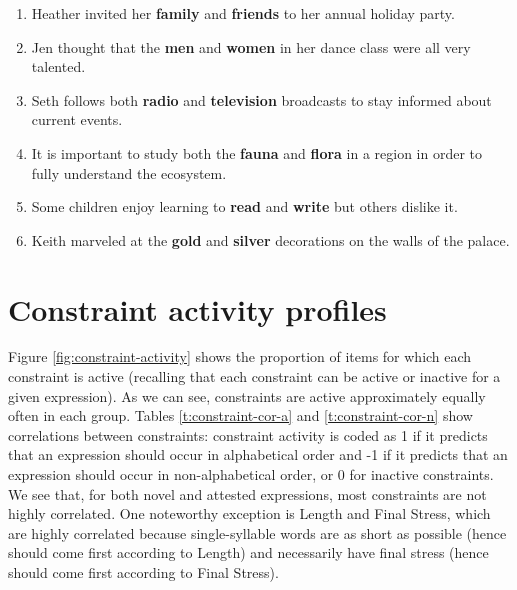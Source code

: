 \documentclass[authoryear]{elsarticle}
\begin{document}
\begin{enumerate}
\item Heather invited her \textbf{family} and \textbf{friends} to her annual holiday party.
\item Jen thought that the \textbf{men} and \textbf{women} in her dance class were all very talented.
\item Seth follows both \textbf{radio} and \textbf{television} broadcasts to stay informed about current events.
\item It is important to study both the \textbf{fauna} and \textbf{flora} in a region in order to fully understand the ecosystem.
\item Some children enjoy learning to \textbf{read} and \textbf{write} but others dislike it.
\item Keith marveled at the \textbf{gold} and \textbf{silver} decorations on the walls of the palace.
\end{enumerate}

\section{Constraint activity profiles}\label{a:constraints}
Figure \ref{fig:constraint-activity} shows the proportion of items for which each constraint is active (recalling that each constraint can be active or inactive for a given expression). As we can see, constraints are active approximately equally often in each group. Tables \ref{t:constraint-cor-a} and \ref{t:constraint-cor-n} show correlations between constraints: constraint activity is coded as 1 if it predicts that an expression should occur in alphabetical order and -1 if it predicts that an expression should occur in non-alphabetical order, or 0 for inactive constraints. We see that, for both novel and attested expressions, most constraints are not highly correlated. One noteworthy exception is Length and Final Stress, which are highly correlated because single-syllable words are as short as possible (hence should come first according to Length) and necessarily have final stress (hence should come first according to Final Stress).
\end{document}
